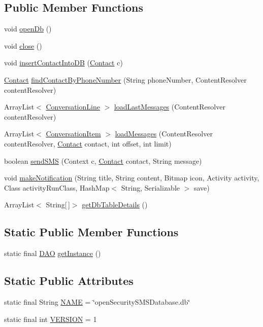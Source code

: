 \subsection*{Public Member Functions}
\begin{DoxyCompactItemize}
\item 
void \hyperlink{a00009_a0e9c1cf6abb64bc19b9c3bdec9eb750b}{open\+Db} ()
\item 
void \hyperlink{a00009_a5ae591df94fc66ccb85cbb6565368bca}{close} ()
\item 
void \hyperlink{a00009_a0d261830f979d2b82adddde282a4074d}{insert\+Contact\+Into\+D\+B} (\hyperlink{a00005}{Contact} c)
\item 
\hyperlink{a00005}{Contact} \hyperlink{a00009_a0074262a1e69f8e9deb0ea44e55c021b}{find\+Contact\+By\+Phone\+Number} (String phone\+Number, Content\+Resolver content\+Resolver)
\item 
Array\+List$<$ \hyperlink{a00008}{Conversation\+Line} $>$ \hyperlink{a00009_a47fd191a6b728f32b3b232b836d97f1c}{load\+Last\+Messages} (Content\+Resolver content\+Resolver)
\item 
Array\+List$<$ \hyperlink{a00007}{Conversation\+Item} $>$ \hyperlink{a00009_acc6f8d4836ab29c22365b7f6e0763a15}{load\+Messages} (Content\+Resolver content\+Resolver, \hyperlink{a00005}{Contact} contact, int offset, int limit)
\item 
boolean \hyperlink{a00009_aefc9fb17466b37d1b0a6f37ecbcb9657}{send\+S\+M\+S} (Context c, \hyperlink{a00005}{Contact} contact, String message)
\item 
void \hyperlink{a00009_a056267ebf36c250c0b67cca3564ea3f9}{make\+Notification} (String title, String content, Bitmap icon, Activity activity, Class activity\+Run\+Class, Hash\+Map$<$ String, Serializable $>$ save)
\item 
Array\+List$<$ String\mbox{[}$\,$\mbox{]}$>$ \hyperlink{a00009_ad6830b697058550025465b603b1b254a}{get\+Db\+Table\+Details} ()
\end{DoxyCompactItemize}
\subsection*{Static Public Member Functions}
\begin{DoxyCompactItemize}
\item 
static final \hyperlink{a00009}{D\+A\+O} \hyperlink{a00009_a0d87654bfa9eb4fd33a79c470d4dc6f3}{get\+Instance} ()
\end{DoxyCompactItemize}
\subsection*{Static Public Attributes}
\begin{DoxyCompactItemize}
\item 
static final String \hyperlink{a00009_a2e2a8b5e4b33363e36e2d75ff425c86c}{N\+A\+M\+E} = \char`\"{}open\+Security\+S\+M\+S\+Database.\+db\char`\"{}
\item 
static final int \hyperlink{a00009_a6cad282e2a906561926b9e4c5c46e92a}{V\+E\+R\+S\+I\+O\+N} = 1
\end{DoxyCompactItemize}
